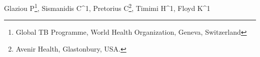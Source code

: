 Glaziou P\footnote{Global TB Programme, World Health Organization, Geneva, Switzerland}, Sismanidis C^1, Pretorius C\footnote{Avenir Health, Glastonbury, USA.}, Timimi H^1, Floyd K^1 


